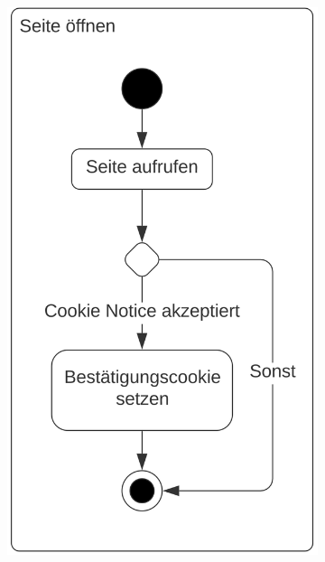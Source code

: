 \begin{center}
\begin{figure}
\begin{subfigure}[c]{0.5\textwidth}
\includegraphics[scale=0.19]{media/activity-usage/SeiteOeffnen}
\end{subfigure}
\begin{subfigure}[c]{0.5\textwidth}

\end{subfigure}
\end{figure}
\end{center}
